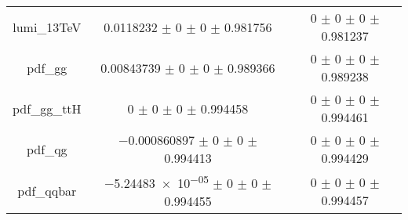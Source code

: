 \begin{table}
\begin{tabular}{ccc}
lumi\_13TeV & \num{0.0118232} $\pm$ \num{0} $\pm$ \num{0} $\pm$ \num{0.981756} & \num{0} $\pm$ \num{0} $\pm$ \num{0} $\pm$ \num{0.981237}\\
pdf\_gg & \num{0.00843739} $\pm$ \num{0} $\pm$ \num{0} $\pm$ \num{0.989366} & \num{0} $\pm$ \num{0} $\pm$ \num{0} $\pm$ \num{0.989238}\\
pdf\_gg\_ttH & \num{0} $\pm$ \num{0} $\pm$ \num{0} $\pm$ \num{0.994458} & \num{0} $\pm$ \num{0} $\pm$ \num{0} $\pm$ \num{0.994461}\\
pdf\_qg & \num{-0.000860897} $\pm$ \num{0} $\pm$ \num{0} $\pm$ \num{0.994413} & \num{0} $\pm$ \num{0} $\pm$ \num{0} $\pm$ \num{0.994429}\\
pdf\_qqbar & \num{-5.24483e-05} $\pm$ \num{0} $\pm$ \num{0} $\pm$ \num{0.994455} & \num{0} $\pm$ \num{0} $\pm$ \num{0} $\pm$ \num{0.994457}\\
\bottomrule
\end{tabular}
\end{table}